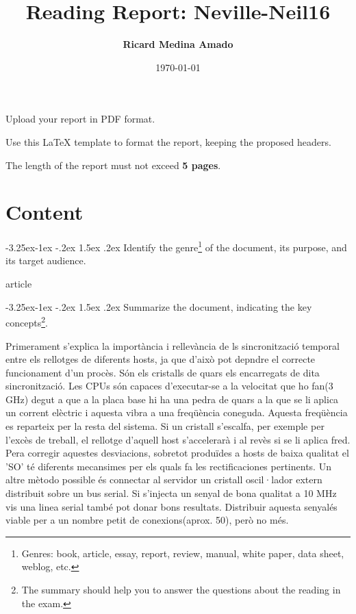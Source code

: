 \documentclass[a4paper, 10pt]{article}
\title{Reading Report:  Neville-Neil16}
\author{\textbf{Ricard Medina Amado}}
\date{\normalsize\today{}}
\makeatletter
\renewcommand\subsection{\@startsection{subsection}{2}{\z@}
	{-3.25ex\@plus -1ex \@minus -.2ex}%
	{1.5ex \@plus .2ex}%
	{\normalfont\large\itshape}}
\makeatother
\begin{document}
\maketitle

\begin{center}
  Upload your report in PDF format.
  
  Use this LaTeX template to format the report, keeping the proposed headers.
  
  The length of the report must not exceed \textbf{5 pages}.
\end{center}

\section{Content}

\subsection{Identify the genre\protect\footnote{Genres: book, article, essay, report, review, manual, white paper, data sheet, weblog, etc.} of the document, its purpose, and its target audience.}

article

\subsection{Summarize the document, indicating the key concepts\protect\footnote{The summary should help you to answer the questions about the reading in the exam.}.}

Primerament s'explica la importància i rellevància de ls sincronització temporal entre els rellotges de diferents hosts, ja que d'això pot depndre el correcte funcionament d'un procès.
Són els cristalls de quars els encarregats de dita sincronització. Les CPUs són capaces d'executar-se a la velocitat que ho fan(3 GHz) degut a que a la placa base hi ha una pedra
de quars a la que se li aplica un corrent elèctric i aquesta vibra a una freqüència coneguda. Aquesta freqüència es reparteix per la resta del sistema.
Si un cristall s'escalfa, per exemple per l'excès de treball, el rellotge d'aquell host s'accelerarà i al revès si se li aplica fred.
Pera corregir aquestes desviacions, sobretot produïdes a hosts de baixa qualitat el 'SO' té diferents mecansimes per els quals fa les rectificaciones pertinents. Un altre mètodo possible és connectar al servidor un cristall
oscil·lador extern distribuit sobre un bus serial. Si s'injecta un senyal de bona qualitat a 10 MHz vis una linea serial també pot donar bons resultats. Distribuir aquesta senyalés viable per a un nombre petit de conexions(aprox. 50), però no més.
\end{document}
